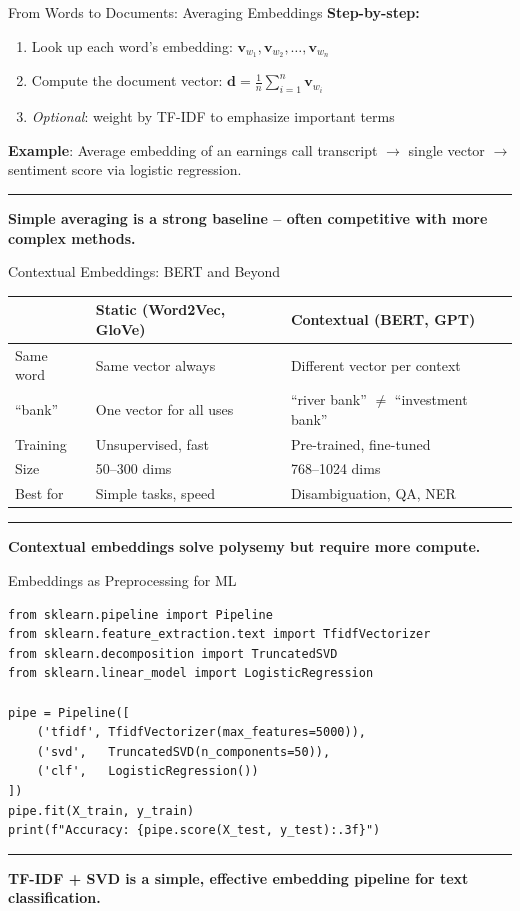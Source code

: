 \documentclass[8pt,aspectratio=169]{beamer}
\newcommand{\bottomnote}[1]{%
\vfill
\vspace{-2mm}
\textcolor{mllavender2}{\rule{\textwidth}{0.4pt}}
\vspace{1mm}
\footnotesize
\textbf{#1}
}
\begin{document}
\begin{frame}{From Words to Documents: Averaging Embeddings}
\textbf{Step-by-step:}
\begin{enumerate}
  \item Look up each word's embedding: $\mathbf{v}_{w_1}, \mathbf{v}_{w_2}, \ldots, \mathbf{v}_{w_n}$
  \item Compute the document vector: $\mathbf{d} = \frac{1}{n}\sum_{i=1}^{n} \mathbf{v}_{w_i}$
  \item \textit{Optional}: weight by TF-IDF to emphasize important terms
\end{enumerate}

\vspace{4pt}
\textbf{Example}: Average embedding of an earnings call transcript
$\rightarrow$ single vector $\rightarrow$ sentiment score via logistic regression.

\bottomnote{Simple averaging is a strong baseline -- often competitive with more complex methods.}
\end{frame}

\begin{frame}{Contextual Embeddings: BERT and Beyond}
\small
\begin{tabular}{p{2.5cm}p{4.5cm}p{4.5cm}}
\toprule
& \textbf{Static (Word2Vec, GloVe)} & \textbf{Contextual (BERT, GPT)} \\
\midrule
Same word & Same vector always & Different vector per context \\
``bank'' & One vector for all uses & ``river bank'' $\neq$ ``investment bank'' \\
Training & Unsupervised, fast & Pre-trained, fine-tuned \\
Size & 50--300 dims & 768--1024 dims \\
Best for & Simple tasks, speed & Disambiguation, QA, NER \\
\bottomrule
\end{tabular}

\bottomnote{Contextual embeddings solve polysemy but require more compute.}
\end{frame}

\begin{frame}[fragile]{Embeddings as Preprocessing for ML}
\small
\begin{verbatim}
from sklearn.pipeline import Pipeline
from sklearn.feature_extraction.text import TfidfVectorizer
from sklearn.decomposition import TruncatedSVD
from sklearn.linear_model import LogisticRegression

pipe = Pipeline([
    ('tfidf', TfidfVectorizer(max_features=5000)),
    ('svd',   TruncatedSVD(n_components=50)),
    ('clf',   LogisticRegression())
])
pipe.fit(X_train, y_train)
print(f"Accuracy: {pipe.score(X_test, y_test):.3f}")
\end{verbatim}

\bottomnote{TF-IDF + SVD is a simple, effective embedding pipeline for text classification.}
\end{frame}
\end{document}
